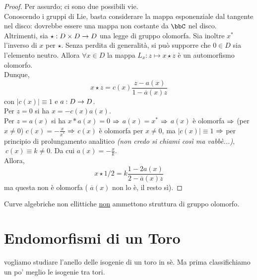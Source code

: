 \begin{proof}
Per assurdo; ci sono due possibili vie.\\
Conoscendo i gruppi di Lie, basta considerare la mappa esponenziale dal tangente nel disco: dovrebbe essere una mappa non costante da $\bbC$ nel disco. \hfill \Lightning \\
Altrimenti, sia $\star : D\times D \rightarrow D$ una legge di gruppo olomorfa. Sia inoltre $x^{*}$ l'inverso di $x$ per $\star$. Senza perdita di generalità, si può supporre che $0 \in D$ sia l'elemento neutro.
Allora $\forall x\in D$ la mappa $L_{x}: z\mapsto x\star z$ è un automorfismo olomorfo. \\
Dunque,  $$x\star z = c(x)\frac{z -a(x)}{1- \overline{a}(x) z}$$
con $|c(x)|\equiv 1$ e $a:D \rightarrow D$.\\
Per $z=0$ si ha $x=-c(x)a(x)$.\\
Per $z=a(x)$ si ha $x*a(x)=0$ $\Rightarrow$ $a(x)=x^{*}$ $\Rightarrow$ $a(x)$ è olomorfa $\Rightarrow$ (per $x\neq 0$) $c(x)=-\frac{x}{x^{*}}$ $\Rightarrow$ $c(x)$ è olomorfa per $x\neq 0$, ma $|c(x)| \equiv 1$ $\Rightarrow$ per principio di prolungamento analitico {\it (non credo si chiami così ma vabbè...)}, $ \ c(x) \equiv k \neq 0$. Da cui $a(x)= -\frac{x}{k}$.\\
Allora, $$x\star 1/2 = k\frac{1-2a(x)}{2-\overline{a}(x) z}$$
ma questa non è olomorfa ( $\overline{a}(x)$ non lo è, il resto sì). 

\end{proof}

\begin{corollario}
Curve algebriche non ellittiche \underline{non} ammettono struttura di gruppo olomorfo.
\end{corollario}

\section{Endomorfismi di un Toro}

 vogliamo studiare l'anello delle isogenie di un toro in sè. Ma prima classifichiamo un po' meglio le isogenie tra tori.

